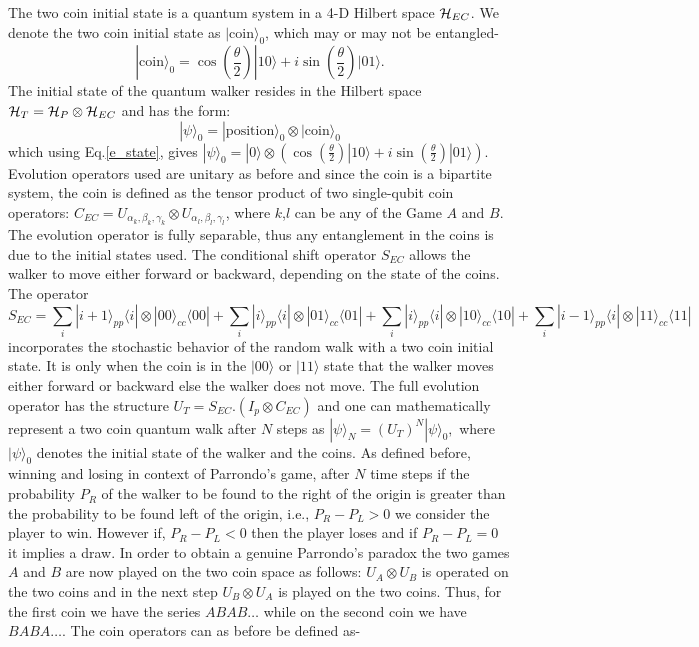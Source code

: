 \documentclass[english,aps,pra,amsmath,amssymb,showpacs,notitlepage,onecolumn]{revtex4-1}
\begin{document}
The two coin initial state is a quantum system in a 4-D Hilbert space ${\cal H}_{EC}$. We denote the two coin initial state as $|\text{coin}\rangle_0$, which may or may not be entangled-
\begin{equation}\label{e_state}
|\text{coin}\rangle_0 = \cos\left(\frac{\theta}{2}\right) |10\rangle + i \sin\left(\frac{\theta}{2}\right) |01\rangle.
\end{equation}
The initial state of the quantum walker resides in the Hilbert space ${\cal H}_T = {\cal H}_P \otimes {\cal H}_{EC}$ and has the form:
\begin{equation}
|\psi\rangle_0 = |\text{position}\rangle_0 \otimes
|\text{coin}\rangle_0
\end{equation}
which using Eq.\ref{e_state}, gives $|\psi\rangle_0 = |0\rangle \otimes \left(\cos\left(\frac{\theta}{2}\right) |10\rangle + i \sin\left(\frac{\theta}{2}\right) |01\rangle \right)$.
Evolution operators used are unitary as before and since the coin is a bipartite system, the coin is defined as the tensor product of two single-qubit coin operators: $C_{EC}=U_{\alpha_k,\beta_k,\gamma_k}\otimes U_{\alpha_l,\beta_l ,\gamma_l}$, where $k$,$l$ can be any of the Game $A$ and $B$. The evolution operator is fully separable, thus any entanglement in the coins is due to the initial states used. The conditional shift operator $S_{EC}$  allows the walker to move either forward or backward, 
depending on the state of the coins. The operator 
\begin{equation}\label{shift_operator_two_spins}
S_{EC} =  \sum_i |i+1 \rangle_{pp} \langle i| \otimes |00\rangle_{cc} \langle 00|  
+ \sum_i |i\rangle_{pp} \langle i| \otimes |01\rangle_{cc} \langle 01| 
+ \sum_i |i\rangle_{pp} \langle i| \otimes |10\rangle_{cc} \langle 10|
+ \sum_i |i-1 \rangle_{pp} \langle i| \otimes |11\rangle_{cc} \langle 11|
\end{equation}
incorporates the stochastic behavior of the random walk with a two coin initial state. It is only when the coin is in the $|00\rangle$ or $|11\rangle$ state that the walker moves either forward or backward else the walker does not move.
The full evolution operator has the structure $U_T = S_{EC}.(I_p \otimes  C_{EC})$ and one can mathematically represent a two coin quantum walk after $N$ steps as $|\psi \rangle_N = (U_T)^N |\psi\rangle_0,$ where $|\psi\rangle_0$ denotes the initial state of the walker and the coins. As defined before, winning and losing in context of Parrondo's game, after $N$ time steps if the probability $P_R$ of the walker to be found to the right of the origin is greater than the probability to be found left of the origin, i.e., $P_R-P_L > 0$ we consider the player to win. However if, $P_R - P_L <  0$ then the player loses and if $P_R-P_L = 0$ it implies a draw. In order to obtain a genuine Parrondo's paradox the two games $A$ and $B$ are now played on the two  coin space as follows: $U_A \otimes U_B$ is operated on the two coins and in the next step $U_B \otimes U_A$ is played on the two coins. Thus, for the first coin we have the series $ABAB\ldots$ while on the second coin we have $BABA\ldots$. The coin operators can as before be defined as-
\end{document}
